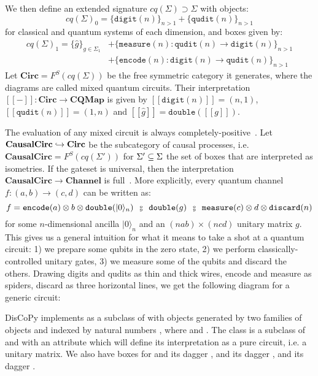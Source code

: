 We then define an extended signature $cq(\Sigma) \supset \Sigma$ with objects:
$$cq(\Sigma)_0 = \{ \mathtt{digit}(n) \}_{n > 1} + \{ \mathtt{qudit}(n) \}_{n > 1}$$
for classical and quantum systems of each dimension, and boxes given by:
\begin{align*}
cq(\Sigma)_1 = \{ \hat{g} \}_{g \in \Sigma_1}
&+ \{ \mathtt{measure}(n) : \mathtt{qudit}(n) \to \mathtt{digit}(n) \}_{n > 1}\\
&+ \{ \mathtt{encode}(n) : \mathtt{digit}(n) \to \mathtt{qudit}(n) \}_{n > 1}
\end{align*}
Let $\mathbf{Circ} = F^S(cq(\Sigma))$ be the free symmetric category it generates, where the diagrams are called mixed quantum circuits.
Their interpretation $[\![-]\!] : \mathbf{Circ} \to \mathbf{CQMap}$ is given by
$[\![\mathtt{digit}(n)]\!] = (n, 1)$, $[\![\mathtt{qudit}(n)]\!] = (1, n)$ and
$[\![\hat{g}]\!] = \mathtt{double}([\![g]\!])$.

The evaluation of any mixed circuit is always completely-positive~\cite[Corollary~8.6]{CoeckeKissinger17}.
Let $\mathbf{CausalCirc} \hookrightarrow \mathbf{Circ}$ be the subcategory of causal processes, i.e. $\mathbf{CausalCirc} = F^S(cq(\Sigma'))$ for $\Sigma' \subseteq \Sigma$ the set of boxes that are interpreted as isometries.
If the gateset is universal, then the interpretation $\mathbf{CausalCirc} \to \mathbf{Channel}$ is full~\cite[Theorem~8.96]{CoeckeKissinger17}.
More explicitly, every quantum channel $f : (a, b) \to (c, d)$ can be written as:
$$f = \mathtt{encode}(a) \otimes b \otimes \mathtt{double}(\vert 0 \rangle_n)
\s \fcmp \s \mathtt{double}(g) \s \fcmp \s
\mathtt{measure}(c) \otimes d \otimes \mathtt{discard}(n)$$
for some $n$-dimensional ancilla $\vert 0 \rangle_n$ and an $(n a b) \times (n c d)$ unitary matrix $g$.
This gives us a general intuition for what it means to take a shot at a quantum circuit: 1) we prepare some qubits in the zero state, 2) we perform classically-controlled unitary gates, 3) we measure some of the qubits and discard the others.
Drawing digits and qudits as thin and thick wires, encode and measure as spiders, discard as three horizontal lines, we get the following diagram for a generic circuit:

DisCoPy implements  as a subclass of  with objects generated by two families of objects  and  indexed by natural numbers , where  and .
The class  is a subclass of  and  with an attribute  which will define its interpretation as a pure circuit, i.e. a unitary matrix.
We also have boxes for  and its dagger ,  and its dagger ,  and its dagger .

